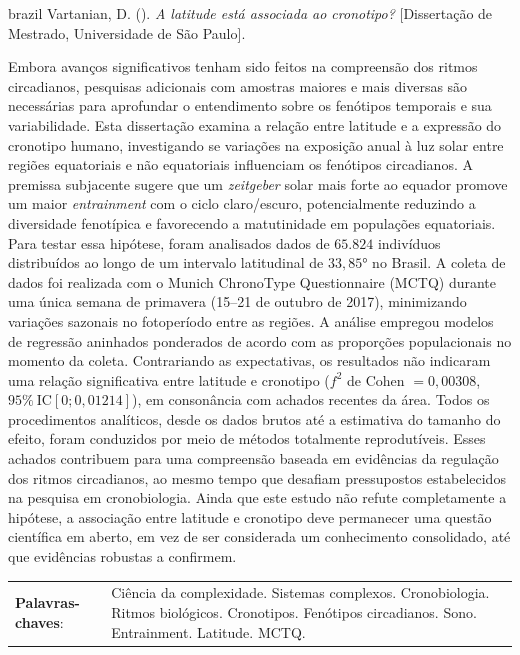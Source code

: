 \documentclass[
12pt,
openright,
oneside,
a4paper,
chapter=TITLE,
section=TITLE,
french,
spanish,
brazil,
english
]{abntex2}
\newcommand{\resumoestrangeironame}{Resumo}
\renewcommand{\resumoname}{Abstract}
\renewcommand{\resumoestrangeironame}{Resumo}
\renewcommand{\resumoname}{Resumo}
\renewcommand{\resumoestrangeironame}{Abstract}
\renewcommand{\resumoname}{Resumen}
\renewcommand{\resumoestrangeironame}{Resumo}
\renewcommand{\resumoname}{Résumé}
\renewcommand{\resumoestrangeironame}{Resumo}
\newenvironment{resumoenv}[1][\resumoname]{
  \pretextualchapter{#1}
  \begingroup
  \setlength{\parindent}{0cm}
  \setlength{\parskip}{\smallskipamount} %
  \AtBeginEnvironment{tabular}{\normalsize}
  \renewcommand{\arraystretch}{1}
  \setlength{\aboverulesep}{0ex}
  \setlength{\belowrulesep}{0ex}
  \setlength{\arrayrulewidth}{0pt}
  \setlength{\tabcolsep}{0cm}
  \vspace{-\smallskipamount} %
  \begin{SingleSpace}
}{
  \end{SingleSpace}
  \cleardoublepage
  \endgroup
}
\renewcommand{\arraystretch}{1.5}
\begin{document}

\begin{resumoenv}[\resumoestrangeironame]
\begin{otherlanguage*}{brazil}
Vartanian, D. ({\imprimirdata}). \textit{A latitude está associada ao cronotipo?} [Dissertação de Mestrado, Universidade de São Paulo].


Embora avanços significativos tenham sido feitos na compreensão dos
ritmos circadianos, pesquisas adicionais com amostras maiores e mais
diversas são necessárias para aprofundar o entendimento sobre os
fenótipos temporais e sua variabilidade. Esta dissertação examina a
relação entre latitude e a expressão do cronotipo humano, investigando
se variações na exposição anual à luz solar entre regiões equatoriais e
não equatoriais influenciam os fenótipos circadianos. A premissa
subjacente sugere que um \emph{zeitgeber} solar mais forte ao equador
promove um maior \emph{entrainment} com o ciclo claro/escuro,
potencialmente reduzindo a diversidade fenotípica e favorecendo a
matutinidade em populações equatoriais. Para testar essa hipótese, foram
analisados dados de \(65.824\) indivíduos distribuídos ao longo de um
intervalo latitudinal de \(33,85°\) no Brasil. A coleta de dados foi
realizada com o Munich ChronoType Questionnaire (MCTQ) durante uma única
semana de primavera (15--21 de outubro de 2017), minimizando variações
sazonais no fotoperíodo entre as regiões. A análise empregou modelos de
regressão aninhados ponderados de acordo com as proporções populacionais
no momento da coleta. Contrariando as expectativas, os resultados não
indicaram uma relação significativa entre latitude e cronotipo (\(f^2\)
de Cohen \(= 0,00308\), \(95\% \ \text{IC}[0; 0,01214]\)), em
consonância com achados recentes da área. Todos os procedimentos
analíticos, desde os dados brutos até a estimativa do tamanho do efeito,
foram conduzidos por meio de métodos totalmente reprodutíveis. Esses
achados contribuem para uma compreensão baseada em evidências da
regulação dos ritmos circadianos, ao mesmo tempo que desafiam
pressupostos estabelecidos na pesquisa em cronobiologia. Ainda que este
estudo não refute completamente a hipótese, a associação entre latitude
e cronotipo deve permanecer uma questão científica em aberto, em vez de
ser considerada um conhecimento consolidado, até que evidências robustas
a confirmem.


\begin{tabular}{p{4cm} p{11.9cm}}
  \textbf{Palavras-chaves}: &  Ciência da complexidade. Sistemas complexos. Cronobiologia. Ritmos biológicos. Cronotipos. Fenótipos circadianos. Sono. Entrainment. Latitude. MCTQ.
\end{tabular}
\end{otherlanguage*}
\end{resumoenv}
\end{document}
